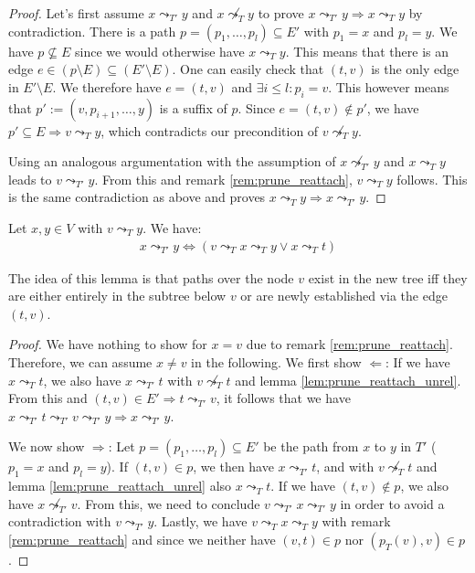 \begin{proof}
    Let's first assume $x \leadsto_{T'} y$ and $x \not\leadsto_{T} y$ to prove $x \leadsto_{T'} y \Rightarrow x \leadsto_T y$ by contradiction. There is a path $p = (p_1, \dots, p_l) \subseteq E'$ with $p_1 = x$ and $p_l = y$. We have $p \not\subseteq E$ since we would otherwise have $x \leadsto_T y$. This means that there is an edge $e \in (p \setminus E) \subseteq (E' \setminus E)$. One can easily check that $(t, v)$ is the only edge in $E' \setminus E$. We therefore have $e = (t, v)$ and $\exists i \leq l: p_i = v$. This however means that $p' := (v, p_{i+1}, \dots, y)$ is a suffix of $p$. Since $e = (t,v) \notin p'$, we have $p' \subseteq E \Rightarrow v \leadsto_{T} y$, which contradicts our precondition of $v \not\leadsto_T y$.

    Using an analogous argumentation with the assumption of $x \not\leadsto_{T'} y$ and $x \leadsto_T y$ leads to $v \leadsto_{T'} y$. From this and remark \ref{rem:prune_reattach}, $v \leadsto_T y$ follows. This is the same contradiction as above and proves $x \leadsto_T y \Rightarrow x \leadsto_{T'} y$.
\end{proof}

\begin{lemma}
    \label{lem:prune_reattach_rel}
    Let $x, y \in V$ with $v \leadsto_T y$. We have:
    \begin{align*}
        x \leadsto_{T'} y \Leftrightarrow (v \leadsto_T x \leadsto_T y \vee x \leadsto_T t)
    \end{align*}
\end{lemma}

The idea of this lemma is that paths over the node $v$ exist in the new tree iff they are either entirely in the subtree below $v$ or are newly established via the edge $(t, v)$.

\begin{proof}
    We have nothing to show for $x = v$ due to remark \ref{rem:prune_reattach}. Therefore, we can assume $x \neq v$ in the following. We first show $\Leftarrow$: If we have $x \leadsto_T t$, we also have $x \leadsto_{T'} t$ with $v \not\leadsto_T t$ and lemma \ref{lem:prune_reattach_unrel}. From this and $(t, v) \in E' \Rightarrow t \leadsto_{T'} v$, it follows that we have $x \leadsto_{T'} t \leadsto_{T'} v \leadsto_{T'} y \Rightarrow x \leadsto_{T'} y$.

    We now show $\Rightarrow$: Let $p = (p_1, \dots, p_l) \subseteq E'$ be the path from $x$ to $y$ in $T'$ ($p_1 = x$ and $p_l = y$). If $(t, v) \in p$, we then have $x \leadsto_{T'} t$, and with $v \not\leadsto_T t$ and lemma \ref{lem:prune_reattach_unrel} also $x \leadsto_T t$. If we have $(t, v) \notin p$, we also have $x \not\leadsto_{T'} v$. From this, we need to conclude $v \leadsto_{T'} x \leadsto_{T'} y$ in order to avoid a contradiction with $v \leadsto_{T'} y$. Lastly, we have $v \leadsto_T x \leadsto_T y$ with remark \ref{rem:prune_reattach} and since we neither have $(v, t) \in p$ nor $(p_T(v), v) \in p$.
\end{proof}

